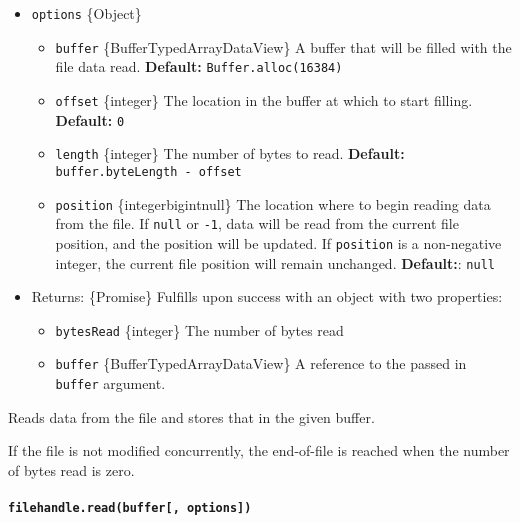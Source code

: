 \begin{itemize}
\tightlist
\item
  \texttt{options} \{Object\}

  \begin{itemize}
  \tightlist
  \item
    \texttt{buffer} \{Buffer\textbar TypedArray\textbar DataView\} A
    buffer that will be filled with the file data read.
    \textbf{Default:} \texttt{Buffer.alloc(16384)}
  \item
    \texttt{offset} \{integer\} The location in the buffer at which to
    start filling. \textbf{Default:} \texttt{0}
  \item
    \texttt{length} \{integer\} The number of bytes to read.
    \textbf{Default:} \texttt{buffer.byteLength\ -\ offset}
  \item
    \texttt{position} \{integer\textbar bigint\textbar null\} The
    location where to begin reading data from the file. If \texttt{null}
    or \texttt{-1}, data will be read from the current file position,
    and the position will be updated. If \texttt{position} is a
    non-negative integer, the current file position will remain
    unchanged. \textbf{Default:}: \texttt{null}
  \end{itemize}
\item
  Returns: \{Promise\} Fulfills upon success with an object with two
  properties:

  \begin{itemize}
  \tightlist
  \item
    \texttt{bytesRead} \{integer\} The number of bytes read
  \item
    \texttt{buffer} \{Buffer\textbar TypedArray\textbar DataView\} A
    reference to the passed in \texttt{buffer} argument.
  \end{itemize}
\end{itemize}

Reads data from the file and stores that in the given buffer.

If the file is not modified concurrently, the end-of-file is reached
when the number of bytes read is zero.

\paragraph{\texorpdfstring{\texttt{filehandle.read(buffer{[},\ options{]})}}{filehandle.read(buffer{[}, options{]})}}\label{filehandle.readbuffer-options}

